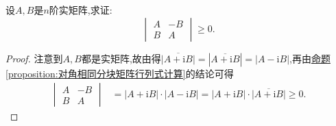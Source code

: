 \documentclass[../../main.tex]{subfiles}%
\begin{document}
\begin{example}
设\(A,B\)是\(n\)阶实矩阵,求证:
\[
\begin{vmatrix}
A & -B\\
B & A
\end{vmatrix}\geqslant 0.
\]
\end{example}
\begin{proof}
注意到\(A,B\)都是实矩阵,故由得\(\overline{|A + \mathrm{i}B|}=|\overline{A + \mathrm{i}B}|=|A - \mathrm{i}B|\),再由\hyperref[proposition:对角相同分块矩阵行列式计算]{命题\ref{proposition:对角相同分块矩阵行列式计算}}的结论可得
\begin{align*}
\begin{vmatrix}
A & -B\\
B & A
\end{vmatrix}&=|A + \mathrm{i}B|\cdot|A - \mathrm{i}B|=|A + \mathrm{i}B|\cdot\overline{|A + \mathrm{i}B|}\geqslant 0.
\end{align*}
\end{proof}
\end{document}
